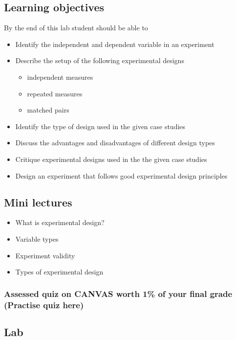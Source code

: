 \documentclass{article}
\begin{document}
\subsection*{Learning objectives}
By the end of this lab student should be able to
\begin{itemize}
  \item Identify the independent and dependent variable in an experiment
\item Describe the setup of the following experimental designs
  \begin{itemize}
  \item independent measures
  \item repeated measures
  \item matched pairs
  \end{itemize}
\item Identify the type of design used in the given case studies
\item Discuss the advantages and disadvantages of different design types
\item Critique experimental designs used in the the given case studies
\item Design an experiment that follows good experimental design principles
\end{itemize}

\subsection*{Mini lectures}

\begin{itemize}
\item What is experimental design?
\item Variable types
\item Experiment validity
\item Types of experimental design
\end{itemize}

\subsubsection*{Assessed quiz on CANVAS worth 1\% of your final grade (Practise quiz here)}

\subsection*{Lab}
\end{document}
